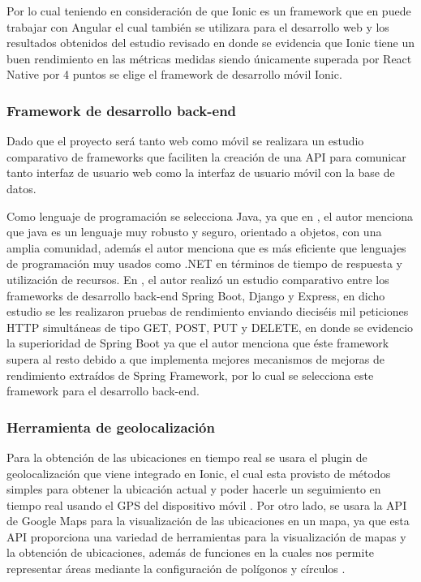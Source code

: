 Por lo cual teniendo en consideración de que Ionic es un framework que en puede trabajar con Angular el cual también se utilizara para el desarrollo web y los resultados obtenidos del estudio revisado en donde se evidencia que Ionic tiene un buen rendimiento en las métricas medidas siendo únicamente superada por React Native por 4 puntos se elige el framework de desarrollo móvil Ionic.

\subsubsection{Framework de desarrollo back-end}

Dado que el proyecto será tanto web como móvil se realizara un estudio comparativo de frameworks que faciliten la creación de una API para comunicar tanto interfaz de usuario web como la interfaz de usuario móvil con la base de datos.
\bigbreak

Como lenguaje de programación se selecciona Java, ya que en \cite{zhang_design_2021}, el autor menciona que java es un lenguaje muy robusto y seguro, orientado a objetos, con una amplia comunidad, además el autor menciona que es más eficiente que lenguajes de programación muy usados como .NET en términos de tiempo de respuesta y utilización de recursos.
\bigbreak
En \cite{choma_efficiency_2023}, el autor realizó un estudio comparativo entre los frameworks de desarrollo back-end Spring Boot, Django y Express, en dicho estudio se les realizaron pruebas de rendimiento enviando dieciséis mil peticiones HTTP simultáneas de tipo GET, POST, PUT y DELETE, en donde se evidencio la superioridad de Spring Boot ya que el autor menciona que éste framework supera al resto debido a que implementa mejores mecanismos de mejoras de rendimiento extraídos de Spring Framework, por lo cual se selecciona este framework para el desarrollo back-end.
\bigbreak

\subsubsection{Herramienta de geolocalización}

Para la obtención de las ubicaciones en tiempo real se usara el plugin de geolocalización que viene integrado en Ionic, el cual esta provisto de métodos simples para obtener la ubicación actual y poder hacerle un seguimiento en tiempo real usando el GPS del dispositivo móvil \cite{ionic_geolocation}.
\bigbreak
Por otro lado, se usara la API de Google Maps para la visualización de las ubicaciones en un mapa, ya que esta API proporciona una variedad de herramientas para la visualización de mapas y la obtención de ubicaciones, además de funciones en la cuales nos permite representar áreas mediante la configuración de polígonos y círculos \cite{poligons}.



